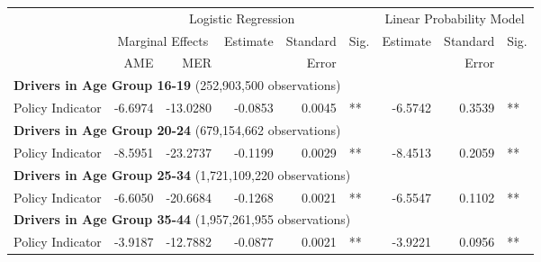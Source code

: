 
\begin{table}%
\centering 
\begin{tabular}{l r r r r l r r l} 

\hline 
 
 & \multicolumn{5}{c}{Logistic Regression}  & \multicolumn{3}{c}{Linear Probability Model} \\ 

 \cmidrule(lr){2-6}\cmidrule(lr){7-9} 
 & \multicolumn{2}{c}{Marginal Effects} & Estimate & Standard & Sig. & Estimate & Standard & Sig. \\ 

 \cmidrule(lr){2-3} 
 &   AME &  MER  &          &  Error   &      &          &  Error   &     \\ 

\hline 
 
\multicolumn{8}{l}{\textbf{Drivers in Age Group 16-19} (252,903,500 observations)} \\ 

Policy Indicator        &  -6.6974        &  -13.0280       &  -0.0853        &  0.0045       &   **       &  -6.5742        &  0.3539       &   **       \\ 

\hline 

\multicolumn{8}{l}{\textbf{Drivers in Age Group 20-24} (679,154,662 observations)} \\ 

Policy Indicator        &  -8.5951        &  -23.2737       &  -0.1199        &  0.0029       &   **       &  -8.4513        &  0.2059       &   **       \\ 

\hline 

\multicolumn{8}{l}{\textbf{Drivers in Age Group 25-34} (1,721,109,220 observations)} \\ 

Policy Indicator        &  -6.6050        &  -20.6684       &  -0.1268        &  0.0021       &   **       &  -6.5547        &  0.1102       &   **       \\ 

\hline 

\multicolumn{8}{l}{\textbf{Drivers in Age Group 35-44} (1,957,261,955 observations)} \\ 

Policy Indicator        &  -3.9187        &  -12.7882       &  -0.0877        &  0.0021       &   **       &  -3.9221        &  0.0956       &   **       \\ 


\end{tabular}
\end{table}
